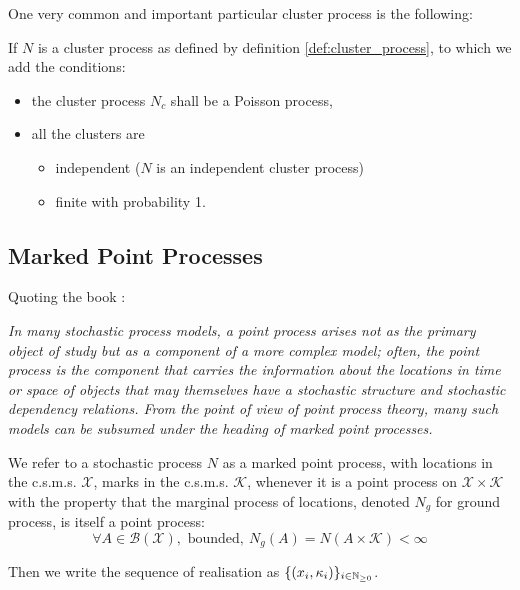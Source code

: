 One very common and important particular cluster process is the following:
\begin{definition}
\label{def:poisson_cluster}
If $N$ is a cluster process as defined by definition \ref{def:cluster_process}, to which we add the conditions:

\begin{itemize}
\setlength{\itemindent}{2.5 cm}
\item the cluster process $N_c$ shall be a Poisson process,
\item all the clusters are 
\begin{itemize}
\setlength{\itemindent}{3 cm}
\item independent ($N$ is an independent cluster process)
\item finite with probability 1.
\end{itemize}
\end{itemize}

\end{definition}




\newpage
\subsection{Marked Point Processes}
Quoting the book \cite{daley}:

\textit{In many stochastic process models, a point process arises not as the primary object of study but as a component of a more complex model; often, the point process is the component that carries the information about the locations in time or space of objects that may themselves have a stochastic structure and stochastic dependency relations. From the point of view of point process theory, many such models can be subsumed under the heading of marked point processes.}
\begin{definition}
We refer to a stochastic process $N$ as a marked point process, with locations in the c.s.m.s. $\mathcal X$, marks in the c.s.m.s. $\mathcal K$, whenever it is a point process on $\mathcal X \times \mathcal K$ with the property that the marginal process of locations, denoted $N_g$ for ground process, is itself a point process:
\begin{equation} 
\forall A \in \mathcal B ( \mathcal X ), \text{ bounded}, \ N_g ( A ) = N( A \times \mathcal K ) < \infty
\end{equation}

Then we write the sequence of realisation as $ \{  (x_i,\kappa_i)  \}_{ i \in \mathbb{N}_{\geq 0}} $.
\end{definition}


